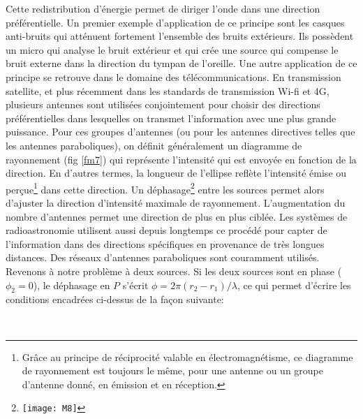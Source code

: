 Cette redistribution d'énergie permet de diriger l'onde dans une direction préférentielle. Un premier exemple d'application de ce principe sont les casques anti-bruits qui atténuent fortement l'ensemble des bruits extérieurs. Ils possèdent un micro qui analyse le bruit extérieur et qui crée une source qui compense le bruit externe dans la direction du tympan de l'oreille. Une autre application de ce principe se retrouve dans le domaine des télécommunications. En transmission satellite, et plus récemment dans les standards de transmission Wi-fi et 4G, plusieurs antennes sont utilisées conjointement pour choisir des directions préférentielles dans lesquelles on transmet l'information avec une plus grande puissance. Pour ces groupes d'antennes (ou pour les antennes directives telles que les antennes paraboliques), on définit généralement un diagramme de rayonnement (fig \ref{fm7}) qui représente l'intensité qui est envoyée en fonction de la direction. En d'autres termes, la longueur de l'ellipse reflète l'intensité émise ou perçue\footnote{Grâce au principe de réciprocité valable en électromagnétisme, ce diagramme de rayonnement est toujours le même, pour une antenne ou un groupe d'antenne donné, en émission et en réception.} dans cette direction.   Un déphasage\footnote{\texttt{[image: M8]}} entre les sources permet alors d'ajuster la direction d'intensité maximale de rayonnement. L'augmentation du nombre d'antennes permet une direction de plus en plus ciblée.
Les systèmes de radioastronomie utilisent aussi depuis longtemps ce procédé pour capter de l'information dans des directions spécifiques en provenance de très longues distances. Des réseaux d'antennes paraboliques sont couramment utilisés.\\

Revenons à notre problème à deux sources. Si les deux sources sont en phase ($\phi_2=0$), le déphasage en $P$ s'écrit $\phi=2\pi(r_2-r_1)/\lambda$, ce qui permet d'écrire les conditions encadrées ci-dessus de la façon suivante:

\\

